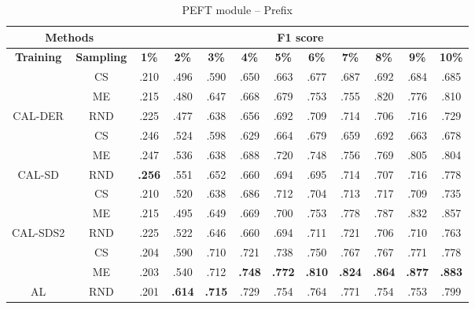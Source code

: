\begin{table}[htbp]
\begin{subtable}{\linewidth}
\begin{tabular}{c|c|cccccccccc}
\toprule
\multicolumn{2}{c|}{\textbf{Methods}} & \multicolumn{10}{c}{\textbf{F1 score}} \\
\midrule
\textbf{Training} & \textbf{Sampling} & \textbf{1\%} & \textbf{2\%} & \textbf{3\%} & \textbf{4\%} & \textbf{5\%} & \textbf{6\%} & \textbf{7\%} & \textbf{8\%} & \textbf{9\%} & \textbf{10\%}\\
\midrule
 & CS & .210 & .496 & .590 & .650 & .663 & .677 & .687 & .692 & .684 & .685\\

 & ME & .215 & .480 & .647 & .668 & .679 & .753 & .755 & .820 & .776 & .810\\

\multirow{-3}{*}{\raggedright\arraybackslash CAL-DER} & RND & .225 & .477 & .638 & .656 & .692 & .709 & .714 & .706 & .716 & .729\\
\midrule
 & CS & .246 & .524 & .598 & .629 & .664 & .679 & .659 & .692 & .663 & .678\\

 & ME & .247 & .536 & .638 & .688 & .720 & .748 & .756 & .769 & .805 & .804\\

\multirow{-3}{*}{\raggedright\arraybackslash CAL-SD} & RND & \textbf{.256} & .551 & .652 & .660 & .694 & .695 & .714 & .707 & .716 & .778\\
\midrule
 & CS & .210 & .520 & .638 & .686 & .712 & .704 & .713 & .717 & .709 & .735\\

 & ME & .215 & .495 & .649 & .669 & .700 & .753 & .778 & .787 & .832 & .857\\

\multirow{-3}{*}{\raggedright\arraybackslash CAL-SDS2} & RND & .225 & .522 & .646 & .660 & .694 & .711 & .721 & .706 & .710 & .763\\
\midrule
 & CS & .204 & .590 & .710 & .721 & .738 & .750 & .767 & .767 & .771 & .778\\

 & ME & .203 & .540 & .712 & \textbf{.748} & \textbf{.772} & \textbf{.810} & \textbf{.824} & \textbf{.864} & \textbf{.877} & \textbf{.883}\\

\multirow{-3}{*}{\raggedright\arraybackslash AL} & RND & .201 & \textbf{.614} & \textbf{.715} & .729 & .754 & .764 & .771 & .754 & .753 & .799\\
\bottomrule
\end{tabular}
\end{subtable}
\vspace{1em}
\begin{subtable}{\linewidth}
\centering
\caption{PEFT module -- Prefix}


\end{subtable}
\end{table}
